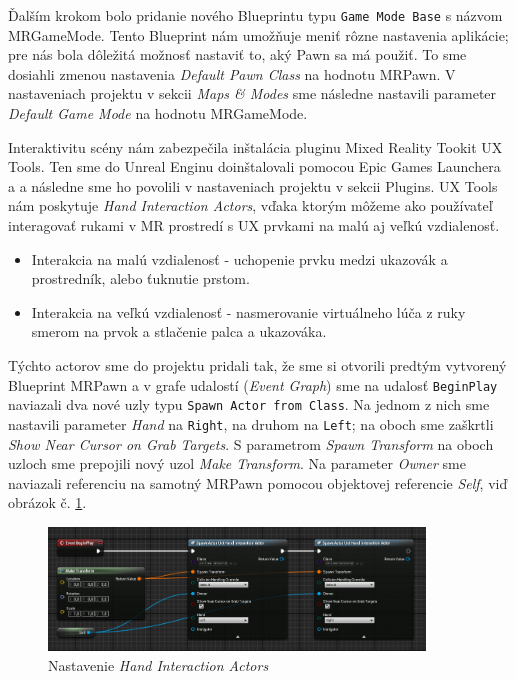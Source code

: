 Ďalším krokom bolo pridanie nového Blueprintu typu \texttt{Game Mode Base} s názvom MRGameMode. Tento Blueprint nám umožňuje meniť rôzne nastavenia aplikácie; pre nás bola dôležitá možnosť nastaviť 
to, aký Pawn sa má použiť. To sme dosiahli zmenou nastavenia \emph{Default Pawn Class} na hodnotu MRPawn. V nastaveniach projektu v sekcii \emph{Maps \& Modes} sme následne nastavili parameter
\emph{Default Game Mode} na hodnotu MRGameMode.

Interaktivitu scény nám zabezpečila inštalácia pluginu Mixed Reality Tookit UX Tools. Ten sme do Unreal Enginu doinštalovali pomocou Epic Games Launchera a a následne sme ho povolili v nastaveniach
projektu v sekcii Plugins. UX Tools nám poskytuje \emph{Hand Interaction Actors}, vďaka ktorým môžeme ako používateľ interagovať rukami v MR prostredí s UX prvkami na malú aj veľkú vzdialenosť.
\begin{itemize}
  \item Interakcia na malú vzdialenosť - uchopenie prvku medzi ukazovák a prostredník, alebo ťuknutie prstom.
  \item Interakcia na veľkú vzdialenosť - nasmerovanie virtuálneho lúča z ruky smerom na prvok a stlačenie palca a ukazováka.
\end{itemize}
Týchto actorov sme do projektu pridali tak, že sme si otvorili predtým vytvorený Blueprint MRPawn a v grafe udalostí (\emph{Event Graph}) sme na udalosť \texttt{BeginPlay} naviazali dva nové uzly
typu \texttt{Spawn Actor from Class}. Na jednom z nich sme nastavili parameter \emph{Hand} na \texttt{Right}, na druhom na \texttt{Left}; na oboch sme zaškrtli \emph{Show Near Cursor on Grab Targets}.
S parametrom \emph{Spawn Transform} na oboch uzloch sme prepojili nový uzol \emph{Make Transform}. Na parameter \emph{Owner} sme naviazali referenciu na samotný MRPawn pomocou objektovej referencie
\emph{Self}, viď obrázok č. \ref{spawn-actor}.

\begin{figure}[!htbp]
  \centering
  \includegraphics[width=10cm]{img/spawn-actor.png}
  \caption{Nastavenie \emph{Hand Interaction Actors}}
  \label{spawn-actor}
\end{figure}

